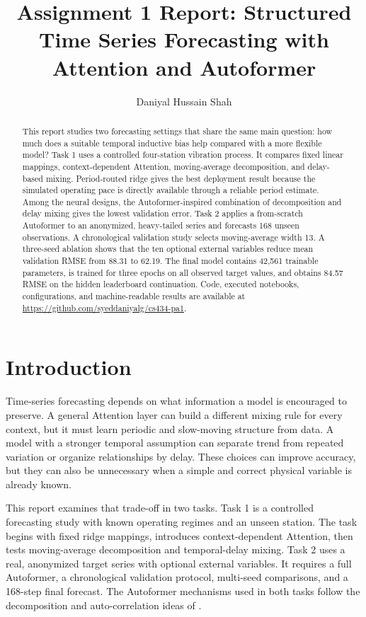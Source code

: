 \documentclass{article}
\title{Assignment 1 Report: Structured Time Series Forecasting with Attention and Autoformer}
\author{
  Daniyal Hussain Shah
}
\begin{document}
\maketitle

\begin{abstract}
This report studies two forecasting settings that share the same main question: how much does a suitable temporal inductive bias help compared with a more flexible model? Task 1 uses a controlled four-station vibration process. It compares fixed linear mappings, context-dependent Attention, moving-average decomposition, and delay-based mixing. Period-routed ridge gives the best deployment result because the simulated operating pace is directly available through a reliable period estimate. Among the neural designs, the Autoformer-inspired combination of decomposition and delay mixing gives the lowest validation error. Task 2 applies a from-scratch Autoformer to an anonymized, heavy-tailed series and forecasts 168 unseen observations. A chronological validation study selects moving-average width 13. A three-seed ablation shows that the ten optional external variables reduce mean validation RMSE from 88.31 to 62.19. The final model contains 42,561 trainable parameters, is trained for three epochs on all observed target values, and obtains 84.57 RMSE on the hidden leaderboard continuation. Code, executed notebooks, configurations, and machine-readable results are available at \url{https://github.com/syeddaniyalg/cs434-pa1}.
\end{abstract}

\section{Introduction}

Time-series forecasting depends on what information a model is encouraged to preserve. A general Attention layer can build a different mixing rule for every context, but it must learn periodic and slow-moving structure from data. A model with a stronger temporal assumption can separate trend from repeated variation or organize relationships by delay. These choices can improve accuracy, but they can also be unnecessary when a simple and correct physical variable is already known.

This report examines that trade-off in two tasks. Task 1 is a controlled forecasting study with known operating regimes and an unseen station. The task begins with fixed ridge mappings, introduces context-dependent Attention, then tests moving-average decomposition and temporal-delay mixing. Task 2 uses a real, anonymized target series with optional external variables. It requires a full Autoformer, a chronological validation protocol, multi-seed comparisons, and a 168-step final forecast. The Autoformer mechanisms used in both tasks follow the decomposition and auto-correlation ideas of \citet{wu2021autoformer}.
\end{document}
